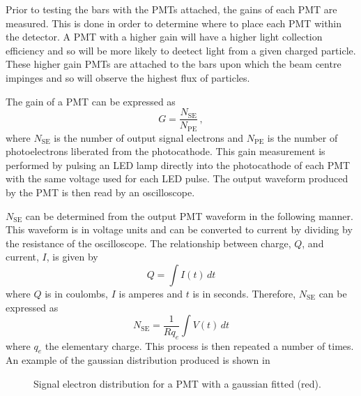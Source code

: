 Prior to testing the bars with the PMTs attached, the gains of each PMT are measured.
This is done in order to determine where to place each PMT within the detector.
A PMT with a higher gain will have a higher light collection efficiency and so will be more likely to deetect light from a given charged particle.
These higher gain PMTs are attached to the bars upon which the beam centre impinges and so will observe the highest flux of particles.

The gain of a PMT can be expressed as
\begin{equation}
  G = \frac{N_{\text{SE}}}{N_{\text{PE}}} \, ,
\end{equation}
where $N_{\text{SE}}$ is the number of output signal electrons and $N_{\text{PE}}$ is the number of photoelectrons liberated from the photocathode.
This gain measurement is performed by pulsing an LED lamp directly into the photocathode of each PMT with the same voltage used for each LED pulse.
The output waveform produced by the PMT is then read by an oscilloscope.

$N_{\text{SE}}$ can be determined from the output PMT waveform in the following manner.
This waveform is in voltage units and can be converted to current by dividing by the resistance of the oscilloscope.
The relationship between charge, $Q$, and current, $I$, is given by
\begin{equation}
  Q = \int I(t) \, dt
\end{equation}
where $Q$ is in coulombs, $I$ is amperes and $t$ is in seconds.
Therefore, $N_{\text{SE}}$ can be expressed as
\begin{equation}
  N_{\text{SE}} = \frac{1}{R q_{e}} \int V(t) \, dt
\end{equation}
where $q_{e}$ the elementary charge.
This process is then repeated a number of times.
An example of the gaussian distribution produced is shown in 

\begin{figure}[h]
  \begin{adjustbox}{max totalsize={\textwidth}, center}
    
  \end{adjustbox}
  \caption[Signal electron distribution for a PMT]{Signal electron distribution for a PMT with a gaussian fitted (red).}
  \label{fig:N_se}
\end{figure}





